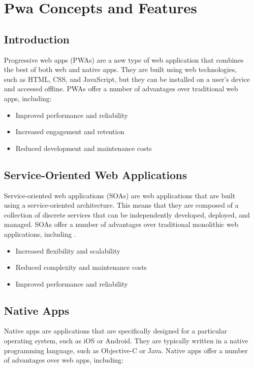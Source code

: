 \documentclass{report}
\begin{document}


\tableofcontents

\chapter{Pwa Concepts and Features}\label{PWA Concepts And Features}
\section{Introduction}\label{intro}
Progressive web apps (PWAs) are a new type of web application that combines the best of both web and native apps. They are built using web technologies, such as HTML, CSS, and JavaScript, but they can be installed on a user's device and accessed offline. PWAs offer a number of advantages over traditional web apps, including: 
\begin{itemize}
    \item Improved performance and reliability
    \item Increased engagement and retention
    \item Reduced development and maintenance costs
\end{itemize}
\section{Service-Oriented Web Applications }\label{ServiciosWeb}

Service-oriented web applications (SOAs) are web applications that are built using a service-oriented architecture. This means that they are composed of a collection of discrete services that can be independently developed, deployed, and managed. SOAs offer a number of advantages over traditional monolithic web applications, including .\cite{google23}
\begin{itemize}
    \item Increased flexibility and scalability
    \item Reduced complexity and maintenance costs
    \item Improved performance and reliability
\end{itemize}

\section{Native Apps }\label{App Nativas}

Native apps are applications that are specifically designed for a particular operating system, such as iOS or Android. They are typically written in a native programming language, such as Objective-C or Java. Native apps offer a number of advantages over web apps, including: \cite{google23}
\end{document}
